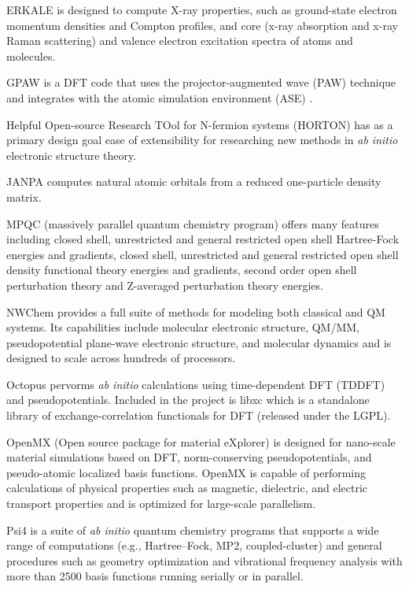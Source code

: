 ERKALE \cite{Lehtola_2012} is designed to compute X-ray properties, such as ground-state electron momentum densities and Compton profiles, and core (x-ray absorption and x-ray Raman scattering) and valence electron excitation spectra of atoms and molecules.

GPAW \cite{gpaw} is a DFT code that uses the projector-augmented wave (PAW) technique \cite{Bl_chl_1994,Kresse_1999} and integrates with the  atomic simulation environment (ASE)  \cite{Bahn_2002}. 

Helpful Open-source Research TOol for N-fermion systems (HORTON) has as a primary design goal ease of extensibility for researching new methods in \textit{ab initio} electronic structure theory.

JANPA \cite{Nikolaienko_2014} computes natural atomic orbitals from a reduced one-particle density matrix.

MPQC (massively parallel quantum chemistry program) \cite{Janssen95} offers many features including closed shell, unrestricted and general restricted open shell Hartree-Fock energies and gradients, closed shell, unrestricted and general restricted open shell density functional theory energies and gradients, second order open shell perturbation theory and Z-averaged perturbation theory energies.

NWChem \cite{Valiev_2010} provides a full suite of methods for modeling both classical and QM systems. Its capabilities include molecular electronic structure, QM/MM, pseudopotential plane-wave electronic structure, and molecular dynamics and is designed to scale across hundreds of processors.

Octopus pervorms \textit{ab initio} calculations using time-dependent DFT (TDDFT) and pseudopotentials.  Included in the project is libxc \cite{Marques_2012} which is a standalone library of exchange-correlation functionals for DFT (released under the LGPL).

OpenMX (Open source package for material eXplorer) \cite{Ozaki_2005} is designed for nano-scale material simulations based on DFT, norm-conserving pseudopotentials, and pseudo-atomic localized basis functions. OpenMX is capable of performing calculations of physical properties such as magnetic, dielectric, and electric transport properties and is optimized for large-scale parallelism.

Psi4 \cite{Turney_2011} is a suite of \textit{ab initio} quantum chemistry programs that supports a wide range of computations (e.g., Hartree–Fock, MP2, coupled-cluster) and general procedures such as geometry optimization and vibrational frequency analysis with more than 2500 basis functions running serially or in parallel.

